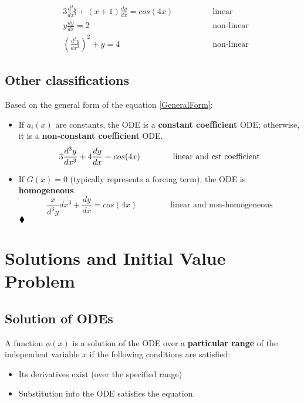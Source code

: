 \begin{exmp}{}
\begin{eqnarray}
&3\frac{d^3 y}{dx^3}+(x+1)\frac{d y}{dx}=cos(4x) \qquad\qquad & \text{linear}\\
&y\frac{d y}{dx}=2 \qquad\qquad & \text{non-linear}\\
&\left(\frac{d^2 y}{dx^2}\right)^2+y=4 \qquad\qquad & \text{non-linear}
\end{eqnarray}
\end{exmp}

\subsection*{Other classifications}
Based on the general form of the equation \eqref{GeneralForm}:
\begin{itemize}
\item If $a_i(x)$ are constants, the ODE is a \textbf{constant coefficient} ODE; otherwise, it is a  \textbf{non-constant coefficient} ODE.
\begin{equation*}
3\frac{d^3 y}{dx^3}+4\frac{d y}{dx}=cos(4x)\qquad \qquad\text{linear and cst coefficient}\\
\end{equation*}
\item If $G(x)=0$ (typically represents a forcing term), the ODE is \textbf{homogeneous}.
\begin{equation*}
\frac x{d^3 y}{dx^3}+\frac{d y}{dx}=cos(4x)\qquad \qquad\text{linear and non-homogeneous}
\end{equation*}
$\mathbin{\blacklozenge}$
\end{itemize}






\section{Solutions and Initial Value Problem}
\subsection{Solution of ODEs}
A function $\phi(x)$ is a solution of the ODE over a \textbf{particular range} of the independent variable $x$ if the following conditions are satisfied:
\begin{itemize}
\item Its derivatives exist (over the specified range)
\item Substitution into the ODE satisfies the equation.
\end{itemize}

